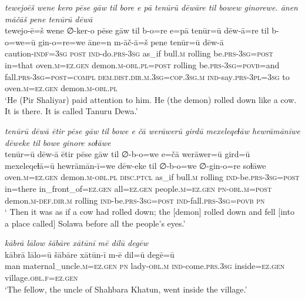 \ea \label{ŽP.200}
\textit{tewejoēš wene kero pēse gāw til bore e pā tenūrū dēwāre til bowew ginorewe. ānen māčāš pene tenūrū dēwā} \\ 
\gll tewejo-ē=š wene ∅-ker-o pēse gāw til b-o=re e=pā tenūr=ū dēw-ā=re til b-o=we=ū gin-o=re=we āne=n m-āč-ā=š pene tenūr=ū dēw-ā \\ 
 caution\textsc{-indf}\textsc{=3sg} \textsc{post} \textsc{ind-}do\textsc{.prs}\textsc{-3sg} as\_if bull\textsc{.m} rolling be\textsc{.prs}\textsc{-3sg}\textsc{=\textsc{post}} in=that oven\textsc{.m}\textsc{\textsc{=ez.gen}} demon\textsc{.m}\textsc{-obl}\textsc{.pl}\textsc{=\textsc{post}} rolling be\textsc{.prs}\textsc{-3sg}\textsc{=\textsc{povb}}=and fall\textsc{.prs}\textsc{-3sg}\textsc{=\textsc{post}}\textsc{=compl} \textsc{dem.dist}\textsc{.dir}\textsc{.m}\textsc{.3sg}\textsc{=cop}\textsc{.3sg}\textsc{.m} \textsc{ind-}say\textsc{.prs}\textsc{-3pl}\textsc{=3sg} to oven\textsc{.m}\textsc{\textsc{=ez.gen}} demon\textsc{.m}\textsc{-obl}\textsc{.pl} \\ 
\glt `He (Pir Shaliyar) paid attention to him. He (the demon) rolled down like a cow. It is there. It is called Tanuru Dewa.'
\z 
 
\ea \label{ŽP.201}
\textit{tenūrū dēwā ētir pēse gāw til bowe e čā werāwerū girdū mexeleqeɫāw hewrāmānīwe dēweke til bowe ginore soɫāwe} \\ 
\gll tenūr=ū dēw-ā ētir pēse gāw til ∅-b-o=we e=čā werāwer=ū gird=ū mexeleqeɫā=ū hewrāmān-ī=we dēw-eke til ∅-b-o=we ∅-gin-o=re soɫāwe \\ 
 oven\textsc{.m}\textsc{\textsc{=ez.gen}} demon\textsc{.m}\textsc{-obl}\textsc{.pl} \textsc{disc.ptcl} as\_if bull\textsc{.m} rolling \textsc{ind-}be\textsc{.prs}\textsc{-3sg}\textsc{=\textsc{post}} in=there in\_front\_of\textsc{\textsc{=ez.gen}} all\textsc{\textsc{=ez.gen}} people\textsc{.m}\textsc{\textsc{=ez.gen}} \textsc{pn}\textsc{-obl}\textsc{.m}\textsc{=\textsc{post}} demon\textsc{.m}\textsc{-def}\textsc{.dir}\textsc{.m} rolling \textsc{ind-}be\textsc{.prs}\textsc{-3sg}\textsc{=\textsc{post}} \textsc{ind-}fall\textsc{.prs}\textsc{-3sg}\textsc{=\textsc{povb}} \textsc{pn} \\ 
\glt ` Then it was as if a cow had rolled down; the [demon] rolled down and fell [into a place called] Solawa before all the people’s eyes.'
\z 
 
\ea \label{ŽP.203}
\textit{kābrā lālow šābāre xātūnī mē dilū degēw} \\ 
\gll kābrā lālo=ū šābāre xātūn-ī m-ē dil=ū degē=ū \\ 
 man maternal\_uncle\textsc{.m}\textsc{\textsc{=ez.gen}} \textsc{pn} lady\textsc{-obl}\textsc{.m} \textsc{ind-}come\textsc{.prs}\textsc{.3sg} inside\textsc{\textsc{=ez.gen}} village\textsc{.obl}\textsc{.f}\textsc{\textsc{=ez.gen}} \\ 
\glt `The fellow, the uncle of Shahbara Khatun, went inside the village.'
\z 
 
